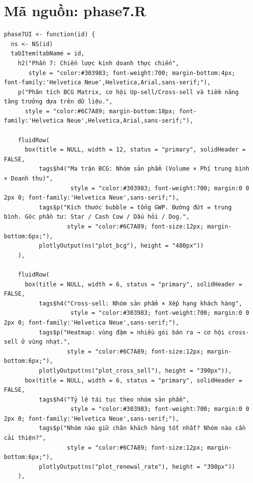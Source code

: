 \documentclass[12pt, a4paper]{article}
\begin{document}
\section{Mã nguồn: phase7.R}
\begin{lstlisting}
phase7UI <- function(id) {
  ns <- NS(id)
  tabItem(tabName = id,
    h2("Phần 7: Chiến lược kinh doanh thực chiến",
       style = "color:#303983; font-weight:700; margin-bottom:4px; font-family:'Helvetica Neue',Helvetica,Arial,sans-serif;"),
    p("Phân tích BCG Matrix, cơ hội Up-sell/Cross-sell và tiềm năng tăng trưởng dựa trên dữ liệu.",
      style = "color:#6C7A89; margin-bottom:18px; font-family:'Helvetica Neue',Helvetica,Arial,sans-serif;"),

    fluidRow(
      box(title = NULL, width = 12, status = "primary", solidHeader = FALSE,
          tags$h4("Ma trận BCG: Nhóm sản phẩm (Volume × Phí trung bình × Doanh thu)",
                   style = "color:#303983; font-weight:700; margin:0 0 2px 0; font-family:'Helvetica Neue',sans-serif;"),
          tags$p("Kích thước bubble = tổng GWP. Đường đứt = trung bình. Góc phần tư: Star / Cash Cow / Dấu hỏi / Dog.",
                  style = "color:#6C7A89; font-size:12px; margin-bottom:6px;"),
          plotlyOutput(ns("plot_bcg"), height = "480px"))
    ),

    fluidRow(
      box(title = NULL, width = 6, status = "primary", solidHeader = FALSE,
          tags$h4("Cross-sell: Nhóm sản phẩm × Xếp hạng khách hàng",
                   style = "color:#303983; font-weight:700; margin:0 0 2px 0; font-family:'Helvetica Neue',sans-serif;"),
          tags$p("Heatmap: vùng đậm = nhiều gói bán ra → cơ hội cross-sell ở vùng nhạt.",
                  style = "color:#6C7A89; font-size:12px; margin-bottom:6px;"),
          plotlyOutput(ns("plot_cross_sell"), height = "390px")),
      box(title = NULL, width = 6, status = "primary", solidHeader = FALSE,
          tags$h4("Tỷ lệ tái tục theo nhóm sản phẩm",
                   style = "color:#303983; font-weight:700; margin:0 0 2px 0; font-family:'Helvetica Neue',sans-serif;"),
          tags$p("Nhóm nào giữ chân khách hàng tốt nhất? Nhóm nào cần cải thiện?",
                  style = "color:#6C7A89; font-size:12px; margin-bottom:6px;"),
          plotlyOutput(ns("plot_renewal_rate"), height = "390px"))
    ),


\end{lstlisting}
\end{document}
